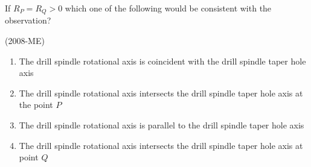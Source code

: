 If $R_P = R_Q > 0$
 which one of the following would be consistent with the observation? 

 \hfill(2008-ME)
 \begin{enumerate}
     \item The drill spindle rotational axis is coincident with the drill spindle taper hole axis 
     \item The drill spindle rotational axis intersects the drill spindle taper hole axis at the point $P$
     \item The drill spindle rotational axis is parallel to the drill spindle taper hole axis 
     \item The drill spindle rotational axis intersects the drill spindle taper hole axis at point $Q$
 \end{enumerate}

